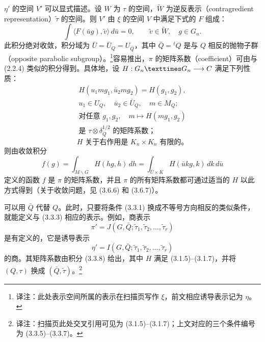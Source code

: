 $\eta'$ 的空间 $V'$ 可以显式描述。设 $W$ 为 $\tau$ 的空间，$\widetilde W$ 为逆反表示（contragredient representation）$\widetilde\tau$ 的空间。则 $V'$ 由 $\xi$ 的空间 $V$ 中满足下式的 $F$ 组成：
\begin{equation}
\int\langle F(\bar u g),\widetilde v\rangle\,d\bar u=0,
\qquad \widetilde v\in\widetilde W,\quad g\in G_n.\tag{3.3.4}
\end{equation}
此积分绝对收敛，积分域为 $\bar U=\bar U_Q=U_{\bar Q}$，其中 $\bar Q={}^tQ$ 是与 $Q$ 相反的抛物子群（opposite parabolic subgroup）。\footnote{译注：此处表示空间所属的表示在扫描页写作 $\xi$，前文相应诱导表示记为 $\eta$。}容易推出，$\pi$ 的矩阵系数（coefficient）可由与 (2.2.4) 类似的积分得到。具体地，设 $H:G_n\times G_n\longrightarrow\C$ 满足下列性质：
\begin{equation}
\begin{gathered}
H(u_1mg_1,\bar u_2mg_2)=H(g_1,g_2),\\
u_1\in U_Q,\quad\bar u_2\in\bar U_Q,\quad m\in M_Q;
\end{gathered}\tag{3.3.5}
\end{equation}
\begin{equation}
\begin{gathered}
\text{对任意 }g_1,g_2,\quad m\longmapsto H(mg_1,g_2)\\
\text{是 }\tau\otimes\delta_Q^{1/2}\text{ 的矩阵系数；}
\end{gathered}\tag{3.3.6}
\end{equation}
\begin{equation}
H\text{ 关于右作用是 }K_n\times K_n\text{ 有限的。}\tag{3.3.7}
\end{equation}
则由收敛积分
\begin{equation}
f(g)=\int_{M\backslash G}H(hg,h)\,dh
=\int_{\bar U\times K}H(\bar u kg,k)\,dk\,d\bar u\tag{3.3.8}
\end{equation}
定义的函数 $f$ 是 $\pi$ 的矩阵系数，并且 $\pi$ 的所有矩阵系数都可通过适当的 $H$ 以此方式得到（关于收敛问题，见 (3.6.6) 和 (3.6.7)）。

可以用 $\bar Q$ 代替 $Q$。此时，只要将条件 (3.3.1) 换成不等号方向相反的类似条件，就能定义与 (3.3.3) 相应的表示。例如，商表示
\begin{equation}
\pi'=J(G,\bar Q;\widetilde\tau_1,\widetilde\tau_2,\ldots,\widetilde\tau_r)\tag{3.3.9}
\end{equation}
是有定义的，它是诱导表示
\begin{equation}
\eta'=I(G,\bar Q;\widetilde\tau_1,\widetilde\tau_2,\ldots,\widetilde\tau_r)\tag{3.3.10}
\end{equation}
的商。其矩阵系数由积分 (3.3.8) 给出，其中 $H$ 满足 (3.1.5)--(3.1.7)，并将 $(Q,\tau)$ 换成 $(\bar Q,\widetilde\tau)$。\footnote{译注：扫描页此处交叉引用可见为 (3.1.5)--(3.1.7)；上文对应的三个条件编号为 (3.3.5)--(3.3.7)。}

